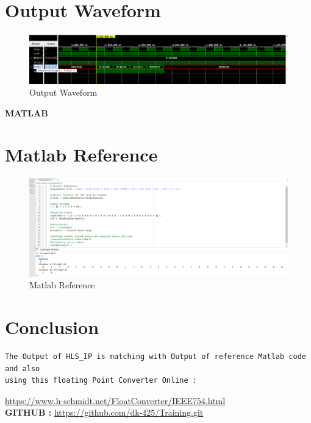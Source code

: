 \documentclass{article}
\begin{document}
\vspace{3cm}


\section{Output Waveform}
\vspace{1cm}
\begin{figure}[h]
\centering
\includegraphics[width=\columnwidth]{figs/p1wav.png}
    \caption{Output Waveform}
    \label{fig:my_label}
\end{figure}
\vspace{15cm}

\maketitle
\hfill \textbf{MATLAB}
\section{Matlab Reference}
\begin{figure}[h]
\centering
\includegraphics[width=\columnwidth]{figs/actual_matlab.png}
    \caption{Matlab Reference}
    \label{fig:my_label}
\end{figure}
\vspace{3cm}
\section{Conclusion}
\begin{lstlisting}
The Output of HLS_IP is matching with Output of reference Matlab code and also
using this floating Point Converter Online :

\end{lstlisting}
\url{https://www.h-schmidt.net/FloatConverter/IEEE754.html}
\vspace{4cm}
\\
\textbf{GITHUB :} \url{https://github.com/dk-425/Training.git}
\end{document}
